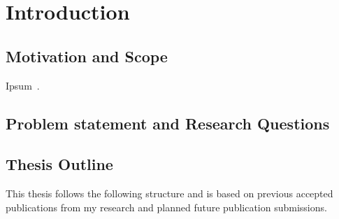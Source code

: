 
\chapter{Introduction}  %
\placeholder{}

\ifpdf
    \graphicspath{{Chapter1/Figs/Raster/}{Chapter1/Figs/PDF/}{Chapter1/Figs/}}
\else
    \graphicspath{{Chapter1/Figs/Vector/}{Chapter1/Figs/}}
\fi


\section{Motivation and Scope} %


Ipsum~\citep{AAB95,Con90,LM65}.


\section{Problem statement and Research Questions}  %



\section{Thesis Outline} 

This thesis follows the following structure and is based on previous accepted publications from my research and planned future publication submissions.